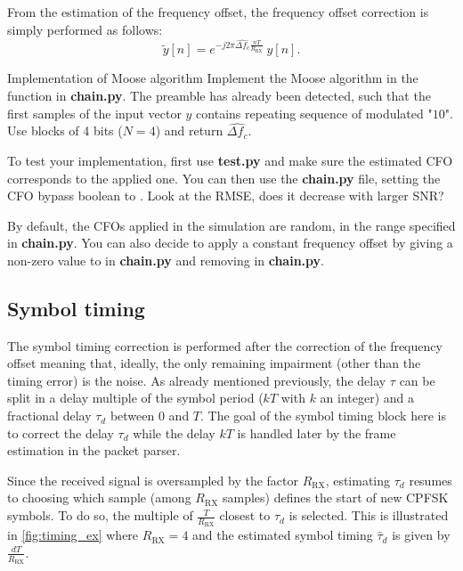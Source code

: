 From the estimation of the frequency offset, the frequency offset correction is simply performed as follows:
\begin{equation*}
    \tilde{y}[n] = e^{-j2\pi \widehat{\Delta f_c} \frac{nT}{R_{\text{RX}}}}\:y[n].
\end{equation*}


\begin{bclogo}[couleur = gray!20, arrondi = 0.2, logo=\bccrayon]{Implementation of Moose algorithm}
Implement the Moose algorithm in the  function in \textbf{chain.py}. The preamble has already been detected, such that the first samples of the input vector $y$ contains repeating sequence of modulated "$10$". Use blocks of 4 bits ($N=4$) and return $\widehat{\Delta f_c}$.

To test your implementation, first use \textbf{test.py} and make sure the estimated CFO corresponds to the applied one. You can then use the \textbf{chain.py} file, setting the CFO bypass boolean to . Look at the RMSE, does it decrease with larger SNR?

By default, the CFOs applied in the simulation are random, in the range specified in \textbf{chain.py}. You can also decide to apply a constant frequency offset by giving a non-zero value to  in \textbf{chain.py} and removing  in \textbf{chain.py}.
\end{bclogo}



\subsection{Symbol timing}
The symbol timing correction is performed after the correction of the frequency offset meaning that, ideally, the only remaining impairment (other than the timing error) is the noise. As already mentioned previously, the delay $\tau$ can be split in a delay multiple of the symbol period ($kT$ with $k$ an integer) and a fractional delay $\tau_d$ between 0 and $T$. The goal of the symbol timing block here is to correct the delay $\tau_d$ while the delay $kT$ is handled later by the frame estimation in the packet parser.

Since the received signal is oversampled by the factor $R_{\text{RX}}$, estimating $\tau_d$ resumes to choosing which sample (among $R_{\text{RX}}$ samples) defines the start of new CPFSK symbols. To do so, the multiple of $\frac{T}{R_{\text{RX}}}$
closest to $\tau_d$ is selected. This is illustrated in \autoref{fig:timing_ex} where $R_{\text{RX}}=4$ and the estimated symbol timing $\hat{\tau}_d$ is given by $\frac{dT}{R_{\text{RX}}}$.

